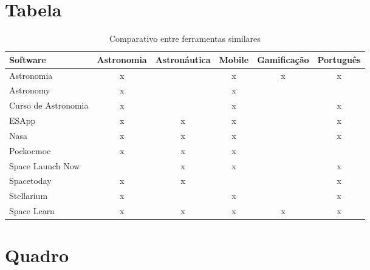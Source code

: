 \section{Tabela}

\begin{table}[ht]
  \caption{Comparativo entre ferramentas similares}
  \label{Tab: Comparativo EA}
  \centering
  
  \begin{tabularx}{\textwidth}{p{4.4cm} ccccc}
    \hline
    \footnotesize\bfseries{Software} & \footnotesize\bfseries{Astronomia}   & \footnotesize\bfseries{Astronáutica}  & \footnotesize\bfseries{Mobile}  & \footnotesize\bfseries{Gamificação} & \footnotesize\bfseries{Português}\\
    \hline
    
        \footnotesize{Astronomia}              & x &   & x & x & x \\
        \footnotesize{Astronomy}               & x &   & x &   &   \\
        \footnotesize{Curso de Astronomia}     & x &   & x &   & x \\
        \footnotesize{ESApp}                   & x & x & x &   & x \\
        \footnotesize{Nasa}                    & x & x & x &   & x \\
        \footnotesize{Pockocmoc}               & x & x & x &   &   \\
        \footnotesize{Space Launch Now}        &   & x & x &   & x \\
        \footnotesize{Spacetoday}              & x & x &   &   & x \\
        \footnotesize{Stellarium}              & x &   & x &   & x \\
        \footnotesize{Space Learn}             & x & x & x & x & x \\ 
   
    \hline
  \end{tabularx}

\end{table}

\section{Quadro}

